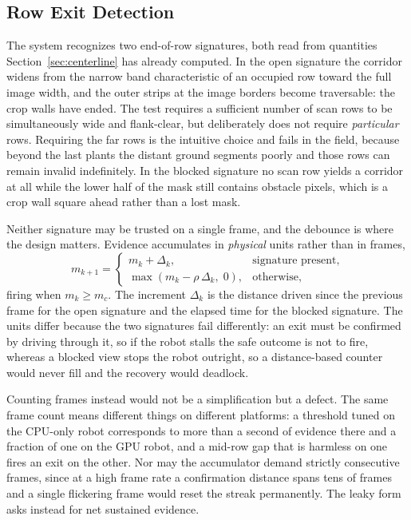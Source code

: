 \documentclass[conference]{IEEEtran}
\begin{document}
\subsection{Row Exit Detection}
\label{sec:exit}
The system recognizes two end-of-row signatures, both read from quantities
Section~\ref{sec:centerline} has already computed. In the open signature the
corridor widens from the narrow band characteristic of an occupied row toward
the full image width, and the outer strips at the image borders become
traversable: the crop walls have ended. The test requires a sufficient number
of scan rows to be simultaneously wide and flank-clear, but deliberately does
not require \emph{particular} rows. Requiring the far rows is the intuitive
choice and fails in the field, because beyond the last plants the distant
ground segments poorly and those rows can remain invalid indefinitely. In the
blocked signature no scan row yields a corridor at all while the lower half of
the mask still contains obstacle pixels, which is a crop wall square ahead
rather than a lost mask.

Neither signature may be trusted on a single frame, and the debounce is where
the design matters. Evidence accumulates in \emph{physical} units rather than
in frames,
\begin{equation}
\label{eq:accumulator}
m_{k+1} =
\begin{cases}
  m_k + \Delta_k, & \text{signature present},\\[2pt]
  \max\!\left(m_k - \rho\,\Delta_k,\; 0\right), & \text{otherwise},
\end{cases}
\end{equation}
firing when $m_k \ge m_c$. The increment $\Delta_k$ is the distance driven
since the previous frame for the open signature and the elapsed time for the
blocked signature. The units differ because the two signatures fail
differently: an exit must be confirmed by driving through it, so if the robot
stalls the safe outcome is not to fire, whereas a blocked view stops the robot
outright, so a distance-based counter would never fill and the recovery would
deadlock.

Counting frames instead would not be a simplification but a defect. The same
frame count means different things on different platforms: a threshold tuned on
the CPU-only robot corresponds to more than a second of evidence there and a
fraction of one on the GPU robot, and a mid-row gap that is harmless on one
fires an exit on the other. Nor may the accumulator demand strictly consecutive
frames, since at a high frame rate a confirmation distance spans tens of frames
and a single flickering frame would reset the streak permanently. The leaky
form asks instead for net sustained evidence.
\end{document}
